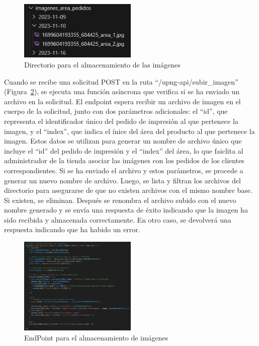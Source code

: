 \documentclass[12pt]{article}
\begin{document}
\begin{figure}[ht]
    \centering
    \includegraphics[width=0.5\textwidth]{imagenes-back/almacenamientoCarpetaImagenes.png}
    \caption{\label{fig:carpetaImagenes} Directorio para el almacenamiento de las imágenes }
    \vspace{\fill}
\end{figure}

Cuando se recibe una solicitud POST en la ruta ``/upng-api/subir\_imagen'' (Figura~\ref{fig:endpointImagen}), se ejecuta una función asíncrona que verifica si se ha enviado
un archivo en la solicitud. El endpoint espera recibir un archivo de imagen en el cuerpo de la solicitud, junto con dos parámetros adicionales: el ``id'', que 
representa el identificador único del pedido de impresión al que pertenece la imagen, y el ``index'', que indica el ínice del área del producto al 
que pertenece la imagen. Estos datos se utilizan para generar un nombre de archivo único que incluye el ``id'' del pedido de impresión y el ``index'' del área,
lo que faiclita al administrador de la tienda asociar las imágenes con los pedidos de los clientes correspondientes. Si se ha enviado el archivo y estos parámetros, se procede a generar un nuevo nombre de archivo. Luego, se lista y filtran los archivos del directorio para asegurarse de que no existen
archivos con el mismo nombre base. Si existen, se eliminan. Después se renombra el archivo subido con el nuevo nombre generado y se envía una respuesta de éxito indicando
que la imagen ha sido recibida y almacenada correctamente. En otro caso, se devolverá una respuesta indicando que ha habido un error. 


\begin{figure}[ht]
    \centering
    \includegraphics[width=0.5\textwidth]{imagenes-back/endpointSubirImagen.png}
    \caption{\label{fig:endpointImagen} EndPoint para el almacenamiento de imágenes }
    \vspace{\fill}
\end{figure}
\end{document}

